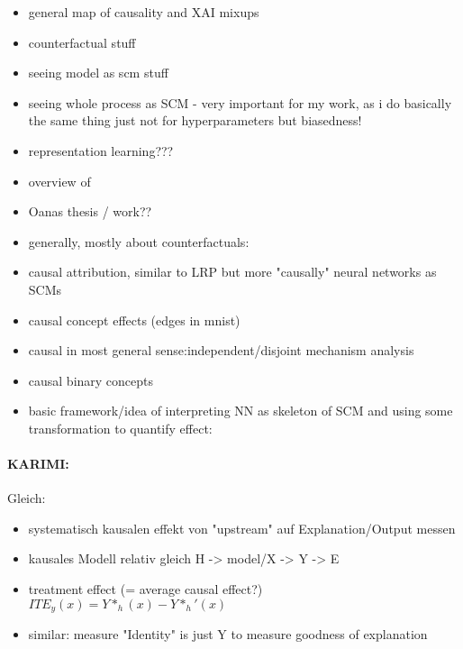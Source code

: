\begin{itemize}
      \item general map of causality and XAI mixups
      \item counterfactual stuff
      \item seeing model as scm stuff \cite{Chattopadhyay2019}
      \item seeing whole process as SCM \cite{Karimi2023} - very important for my work, as i do basically the same thing just not for hyperparameters but biasedness!
      \item representation learning??? 
      \item overview of \cite{Schoelkopf2019}
      \item Oanas thesis / work??
\end{itemize}

\begin{itemize}
      \item generally, mostly about counterfactuals: \cite{Moraffah2020a}
      \item causal attribution, similar to LRP but more "causally" neural networks as SCMs \cite{Chattopadhyay2019}
      \item causal concept effects (edges in mnist) \cite{Goyal2019}
      \item causal in most general sense:independent/disjoint mechanism analysis \cite{Leemann2023} \cite{Leemann2022}
      \item causal binary concepts \cite{Tran2022}
      \item basic framework/idea of interpreting NN as skeleton of SCM and using some transformation to quantify effect:\cite{Narendra2018}
\end{itemize}


\paragraph*{KARIMI:}
\cite{Karimi2023}
Gleich:

\begin{itemize}
      \item systematisch kausalen effekt von "upstream" auf Explanation/Output messen
      \item kausales Modell relativ gleich H -> model/X -> Y -> E
      \item treatment effect (= average causal effect?) $ITE_y(x) = Y*_h(x) - Y*_h'(x)$
      \item similar: measure "Identity" is just Y to measure goodness of explanation
\end{itemize}

